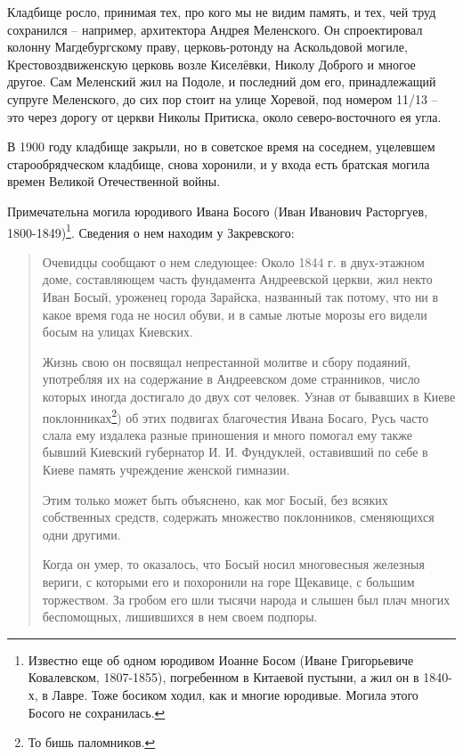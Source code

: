 Кладбище росло, принимая тех, про кого мы не видим память, и тех, чей труд сохранился – например, архитектора Андрея Меленского. Он спроектировал колонну Магдебургскому праву, церковь-ротонду на Аскольдовой могиле, Крестовоздвиженскую церковь возле Киселёвки, Николу Доброго и многое другое. Сам Меленский жил на Подоле, и последний дом его, принадлежащий супруге Меленского, до сих пор стоит на улице Хоревой, под номером 11/13 – это через дорогу от церкви Николы Притиска, около северо-восточного ея угла.

В 1900 году кладбище закрыли, но в советское время на соседнем, уцелевшем старообрядческом кладбище, снова хоронили, и у входа есть братская могила времен Великой Отечественной войны.

Примечательна могила юродивого Ивана Босого (Иван Иванович Расторгуев, 1800-1849)\footnote{Известно еще об одном юродивом Иоанне Босом (Иване Григорьевиче Ковалевском, 1807-1855), погребенном в Китаевой пустыни, а жил он в 1840-х, в Лавре. Тоже босиком ходил, как и многие юродивые. Могила этого Босого не сохранилась.}. Сведения о нем находим у Закревского\cite{zakr01}:

\begin{quotation}
Очевидцы сообщают о нем следующее: Около 1844 г. в двух-этажном доме, составляющем часть фундамента Андреевской церкви, жил некто Иван Босый, уроженец города Зарайска, названный так потому, что ни в какое время года не носил обуви, и в самые лютые морозы его видели босым на улицах Киевских. 

Жизнь свою он посвящал непрестанной молитве и сбору подаяний, употребляя их на содержание в Андреевском доме странников, число которых иногда достигало до двух сот человек. Узнав от бывавших в Киеве поклонниках\footnote{То бишь паломников.}) об этих подвигах благочестия Ивана Босаго, Русь часто слала ему издалека разные приношения и много помогал ему также бывший Киевский губернатор И. И. Фундуклей, оставивший по себе в Киеве память учреждение женской гимназии. 

Этим только может быть объяснено, как мог Босый, без всяких собственных средств, содержать множество поклонников, сменяющихся одни другими. 

Когда он умер, то оказалось, что Босый носил многовесныя железныя вериги, с которыми его и похоронили на горе Щекавице, с большим торжеством. За гробом его шли тысячи народа и слышен был плач многих беспомощных, лишившихся в нем своем подпоры.
\end{quotation}

